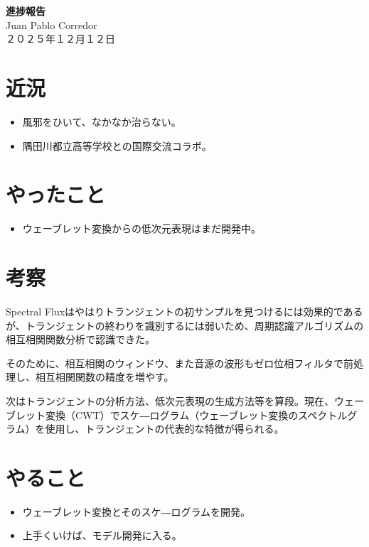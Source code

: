 \documentclass[a4paper, 11pt]{article}
\begin{document}
\begin{center}
    {\LARGE \bfseries 進捗報告} \\ %
    \vspace{0.3em} %
    Juan Pablo Corredor \\ %
    ２０２５年１２月１２日 %
\end{center}
\vspace{0.5em} %

\section*{近況}
\begin{itemize}
    \item 風邪をひいて、なかなか治らない。
    \item 隅田川都立高等学校との国際交流コラボ。
\end{itemize} 

\section*{やったこと}
\begin{itemize} 
    \item ウェーブレット変換からの低次元表現はまだ開発中。
\end{itemize}

\section*{考察}

Spectral Fluxはやはりトランジェントの初サンプルを見つけるには効果的であるが、トランジェントの終わりを識別するには弱いため、周期認識アルゴリズムの相互相関関数分析で認識できた。

そのために、相互相関のウィンドウ、また音源の波形もゼロ位相フィルタで前処理し、相互相関関数の精度を増やす。

次はトランジェントの分析方法、低次元表現の生成方法等を算段。現在、ウェーブレット変換（CWT）でスケ―ログラム（ウェーブレット変換のスペクトルグラム）を使用し、トランジェントの代表的な特徴が得られる。

\section*{やること}
\begin{itemize}
    \item ウェーブレット変換とそのスケ―ログラムを開発。
    \item 上手くいけば、モデル開発に入る。
\end{itemize}


\printbibliography
\end{document}
